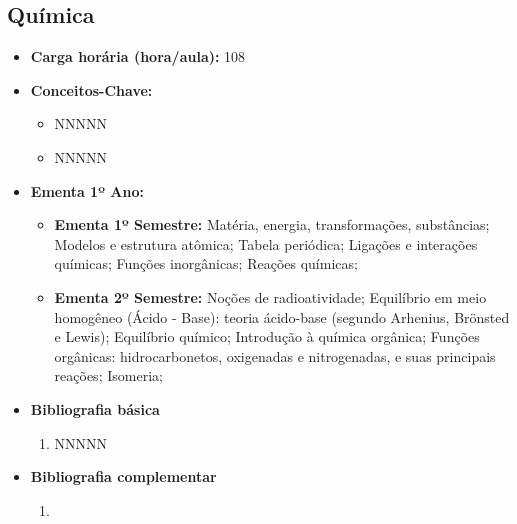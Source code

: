\documentclass[11pt,fleqn]{book} %
\begin{document}
\newpage
\subsection{Química}\label{disc:quimica}
\begin{itemize}
	\item \textbf{Carga horária (hora/aula):} 108
	\item \textbf{Conceitos-Chave:}
	\begin{itemize}
		\item NNNNN
		\item NNNNN
	\end{itemize}
	\item \textbf{Ementa 1º Ano:}
	\begin{itemize}	
		\item \textbf{Ementa 1º Semestre:} 
		Matéria, energia, transformações, substâncias;
		Modelos e estrutura atômica;
		Tabela periódica;
		Ligações e interações químicas;
		Funções inorgânicas;
		Reações químicas;
		
		\item \textbf{Ementa 2º Semestre:} 	
		Noções de radioatividade;
		Equilíbrio em meio homogêneo (Ácido - Base): teoria ácido-base (segundo Arhenius, Brönsted e Lewis);
		Equilíbrio químico;
		Introdução à química orgânica;
		Funções orgânicas: hidrocarbonetos, oxigenadas e nitrogenadas, e suas principais reações; 
		Isomeria;
	\end{itemize}
	\item \textbf{Bibliografia básica}
	\begin{enumerate}
		\item NNNNN
	\end{enumerate}
	\item \textbf{Bibliografia complementar}
	\begin{enumerate}
		\item 
	\end{enumerate}	
\end{itemize}

\newpage
\end{document}
